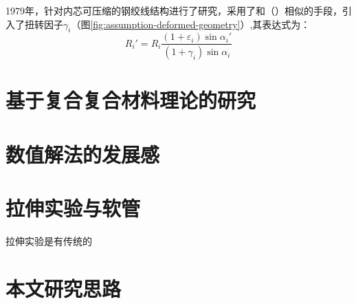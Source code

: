 1979年，\citeauthor{Knapp1979}\cite{Knapp1979}针对内芯可压缩的钢绞线结构进行了研究，采用了和\citeauthor{machida1973}（\citeyear{machida1973}）相似的手段，引入了扭转因子$ \gamma_i $（图\ref{fig:assumption-deformed-geometry}）,其表达式为：
\begin{equation}
{R_i}' = {R_i}\frac{{\left( {1 + {\varepsilon _i}} \right)\sin {\alpha _i}'}}{{\left( {1 + {\gamma _i}} \right)\sin {\alpha _i}}}
\end{equation}



\section{基于复合复合材料理论的研究}














\section{数值解法的发展感}




\section{拉伸实验与软管}
拉伸实验是有传统的

\cite{Hajrasouliha1}\cite{Leung2013}

\section{本文研究思路}